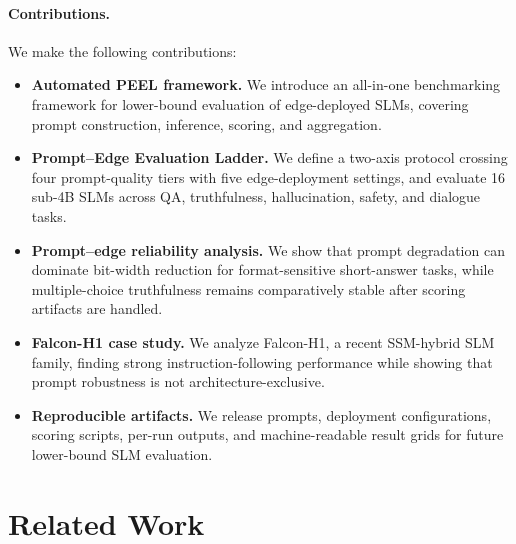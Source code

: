 \documentclass[letterpaper]{article} %
\begin{document}
\paragraph{Contributions.}
We make the following contributions:
\begin{itemize}
\item \textbf{Automated PEEL framework.} We introduce an all-in-one benchmarking framework for lower-bound evaluation of edge-deployed SLMs, covering prompt construction, inference, scoring, and aggregation.

\item \textbf{Prompt--Edge Evaluation Ladder.} We define a two-axis protocol crossing four prompt-quality tiers with five edge-deployment settings, and evaluate 16 sub-4B SLMs across QA, truthfulness, hallucination, safety, and dialogue tasks.

\item \textbf{Prompt--edge reliability analysis.} We show that prompt degradation can dominate bit-width reduction for format-sensitive short-answer tasks, while multiple-choice truthfulness remains comparatively stable after scoring artifacts are handled.

\item \textbf{Falcon-H1 case study.} We analyze Falcon-H1, a recent SSM-hybrid SLM family, finding strong instruction-following performance while showing that prompt robustness is not architecture-exclusive.

\item \textbf{Reproducible artifacts.} We release prompts, deployment configurations, scoring scripts, per-run outputs, and machine-readable result grids for future lower-bound SLM evaluation.
\end{itemize}


\section{Related Work}
\label{sec:related}
\end{document}
